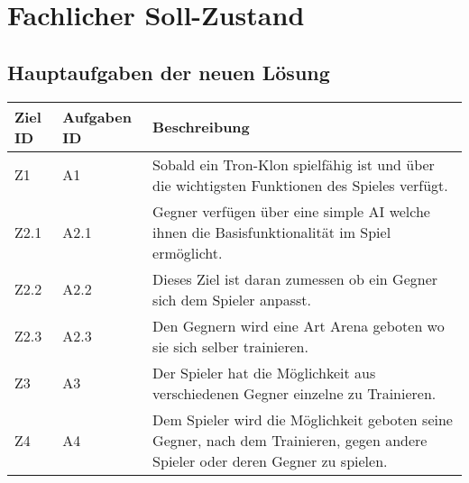 \section{Fachlicher Soll-Zustand}


\subsection{Hauptaufgaben der neuen Lösung}

\begin{tabularx}{\textwidth}{| p{0.7cm} | p{1.5cm} | X |}
\hline
\rowcolor[gray]{0.9} Ziel ID & Aufgaben ID & Beschreibung \\
\hline
Z1 & A1 & Sobald ein Tron-Klon spielfähig ist und über die wichtigsten Funktionen des Spieles verfügt.\\
\hline
Z2.1 & A2.1 & Gegner verfügen über eine simple AI welche ihnen die Basisfunktionalität im Spiel ermöglicht. \\
\hline
Z2.2 & A2.2 & Dieses Ziel ist daran zumessen ob ein Gegner sich dem Spieler anpasst. \\
\hline 
Z2.3 & A2.3 & Den Gegnern wird eine Art Arena geboten wo sie sich selber trainieren. \\
\hline
Z3 & A3 & Der Spieler hat die Möglichkeit aus verschiedenen Gegner einzelne zu Trainieren. \\
\hline
Z4 & A4 & Dem Spieler wird die Möglichkeit geboten seine Gegner, nach dem Trainieren, gegen andere Spieler oder deren Gegner zu spielen. \\
\hline
\end{tabularx}